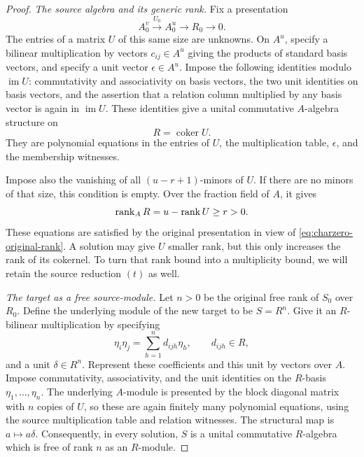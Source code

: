\begin{proof}
\smallskip
\noindent\emph{The source algebra and its generic rank.}
Fix a presentation
\[
 A_0^v\xrightarrow{U_0}A_0^u\longrightarrow R_0\longrightarrow0.
\]
The entries of a matrix $U$ of this same size are unknowns.  On
$A^u$, specify a bilinear multiplication by vectors $c_{ij}\in A^u$
giving the products of standard basis vectors, and specify a unit
vector $\epsilon\in A^u$.  Impose the following identities modulo
$\operatorname{im}U$: commutativity and associativity on basis
vectors, the two unit identities on basis vectors, and the assertion
that a relation column multiplied by any basis vector is again in
$\operatorname{im}U$.  These identities give a unital commutative
$A$-algebra structure on
\[
 R=\operatorname{coker}U.
\]
They are polynomial equations in the entries of $U$, the
multiplication table, $\epsilon$, and the membership witnesses.

Impose also the vanishing of all $(u-r+1)$-minors of $U$.  If there
are no minors of that size, this condition is empty.  Over the
fraction field of $A$, it gives
\begin{equation}\label{eq:charzero-rank-bound}
 \operatorname{rank}_A R=u-\operatorname{rank} U\ge r>0.
\end{equation}
These equations are satisfied by the original presentation in view of
\eqref{eq:charzero-original-rank}. A solution may give $U$ smaller rank,
but this only increases the rank of its cokernel. To turn that rank
bound into a multiplicity bound, we will retain the source reduction
$(t)$ as well.

\smallskip
\noindent\emph{The target as a free source-module.}
Let $n>0$ be the original free rank of $S_0$ over $R_0$.
Define the underlying module of the new target to be $S=R^n$.
Give it an $R$-bilinear multiplication by specifying
\[
 \eta_i\eta_j=\sum_{h=1}^n d_{ijh}\eta_h,
 \qquad d_{ijh}\in R,
\]
and a unit $\delta\in R^n$.  Represent these coefficients and this
unit by vectors over $A$.  Impose commutativity, associativity, and
the unit identities on the $R$-basis $\eta_1,\ldots,\eta_n$.
The underlying $A$-module is presented by the block diagonal matrix
with $n$ copies of $U$, so these are again finitely many polynomial
equations, using the source multiplication table and relation
witnesses.  The structural map is $a\mapsto a\delta$.
Consequently, in every solution, $S$ is a unital commutative
$R$-algebra which is free of rank $n$ as an $R$-module.


\end{proof}
